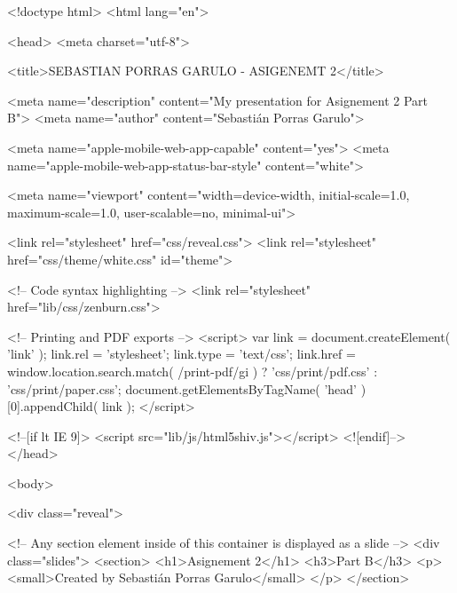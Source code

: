 <!doctype html>
<html lang="en">

	<head>
		<meta charset="utf-8">

		<title>SEBASTIAN PORRAS GARULO - ASIGENEMT 2</title>

		<meta name="description" content="My presentation for Asignement 2 Part B">
		<meta name="author" content="Sebastián Porras Garulo">

		<meta name="apple-mobile-web-app-capable" content="yes">
		<meta name="apple-mobile-web-app-status-bar-style" content="white">

		<meta name="viewport" content="width=device-width, initial-scale=1.0, maximum-scale=1.0, user-scalable=no, minimal-ui">

		<link rel="stylesheet" href="css/reveal.css">
		<link rel="stylesheet" href="css/theme/white.css" id="theme">

		<!-- Code syntax highlighting -->
		<link rel="stylesheet" href="lib/css/zenburn.css">

		<!-- Printing and PDF exports -->
		<script>
			var link = document.createElement( 'link' );
			link.rel = 'stylesheet';
			link.type = 'text/css';
			link.href = window.location.search.match( /print-pdf/gi ) ? 'css/print/pdf.css' : 'css/print/paper.css';
			document.getElementsByTagName( 'head' )[0].appendChild( link );
		</script>

		<!--[if lt IE 9]>
		<script src="lib/js/html5shiv.js"></script>
		<![endif]-->
	</head>

	<body>

		<div class="reveal">

			<!-- Any section element inside of this container is displayed as a slide -->
			<div class="slides">
				<section>
					<h1>Asignement 2</h1>
					<h3>Part B</h3>
					<p>
						<small>Created by Sebastián Porras Garulo</small>
					</p>
				</section>

